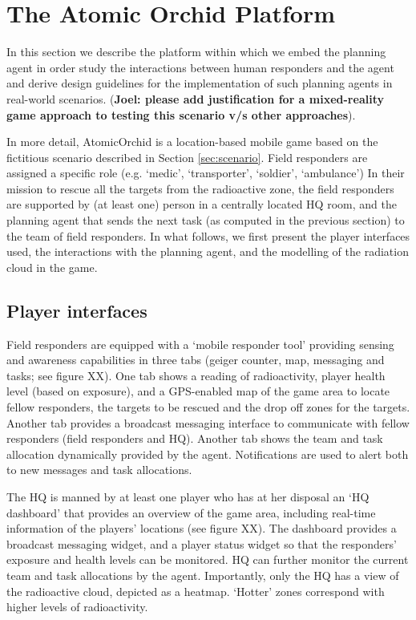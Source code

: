 \section{The Atomic Orchid Platform}
In this section we describe the platform within which we embed the planning agent in order study the interactions between human responders and the agent and derive design guidelines for the implementation of such planning agents in real-world scenarios. (\textbf{Joel: please add justification for a mixed-reality game approach to testing this scenario v/s other approaches}). 

In more detail, AtomicOrchid is a location-based mobile game based on the fictitious scenario described in Section \ref{sec:scenario}. Field responders are assigned a specific role (e.g. `medic', `transporter', `soldier', `ambulance') 
In their mission to rescue all the targets from the radioactive zone, the field responders are supported by (at least one) person in a centrally located HQ room, and the planning agent that sends the next task (as computed in the previous section) to the team of field responders. In what follows, we first present the player interfaces used, the interactions with the planning agent, and the modelling of the radiation cloud in the game.

\subsection{Player interfaces}
Field responders are equipped with a `mobile responder tool' providing sensing and awareness capabilities in three tabs (geiger counter, map, messaging and tasks; see figure XX). One tab shows a reading of radioactivity, player health level (based on exposure), and a GPS-enabled map of the game area to locate fellow responders, the targets to be rescued and the drop off zones for the targets. Another tab provides a broadcast messaging interface to communicate with fellow responders (field responders and HQ). Another tab shows the team and task allocation dynamically provided by the agent. Notifications are used to alert both to new messages and task allocations.

The HQ is manned by at least one player who has at her disposal an `HQ dashboard' that provides an overview of the game area, including real-time information of the players' locations (see figure XX). The dashboard provides a broadcast messaging widget, and a player status widget so that the responders' exposure and health levels can be monitored. HQ can further monitor the  current team and task allocations by the agent. Importantly, only the HQ has a view of the radioactive cloud, depicted as a heatmap. `Hotter' zones correspond with higher levels of radioactivity.

